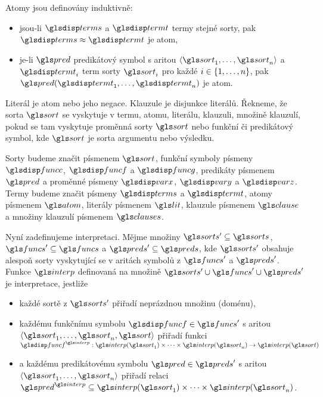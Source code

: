 Atomy jsou definovány induktivně:

\begin{itemize}
\item jsou-li $\termS$ a $\term$ termy stejné sorty,
  pak $\termS \approx \term$ je atom,
\item je-li $\pred$ predikátový symbol
  s aritou $\langle \sort_1 \comdots \sort_n \rangle$
  a $\term_i$ term sorty $\sort_i$ pro každé $i \in \{ 1 , \ldots, n \}$, pak
  $\pred(\term_1 \comdots \term_n)$ je atom.
\end{itemize}

Literál je atom nebo jeho negace. Klauzule je disjunkce literálů.
Řekneme, že sorta $\sort$ se vyskytuje v termu, atomu, literálu, klauzuli,
množině klauzulí, pokud se tam vyskytuje proměnná sorty $\sort$ nebo
funkční či predikátový symbol, kde $\sort$ je sorta argumentu nebo výsledku.


Sorty budeme značit písmenem $\sort$, funkční symboly písmeny
$\funcC$, $\func$ a $\funcG$, predikáty písmenem $\pred$
a proměnné písmeny $\var$, $\varY$ a $\varZ$.
Termy budeme značit písmeny $\termS$ a $\term$, atomy písmenem $\atom$,
literály písmenem $\lit$, klauzule písmenem $\clause$ a množiny
klauzulí písmenem $\clauses$.

Nyní zadefinujeme interpretaci.
Mějme množiny $\sorts' \subseteq \sorts$, $\funcs' \subseteq \funcs$
a $\preds' \subseteq \preds$, kde $\sorts'$ obsahuje alespoň sorty
vyskytující se v aritách symbolů z $\funcs'$ a $\preds'$.
Funkce $\interp$ definovaná na množině $\sorts' \cup \funcs' \cup \preds'$
je interpretace, jestliže

\begin{itemize}
\item každé sortě z $\sorts'$ přiřadí neprázdnou množinu (doménu),
\item každému funkčnímu symbolu $\func \in \funcs'$ s aritou
  $\langle \sort_1 \comdots \sort_n, \sort \rangle$ přiřadí funkci
  $\func^\interp: \interp(\sort_1) \timdots \interp(\sort_n) \to
  \interp(\sort)$
\item a každému predikátovému symbolu $\pred \in \preds'$ s aritou
  $\langle \sort_1 \comdots \sort_n \rangle$ přiřadí relaci
  $\pred^\interp \subseteq \interp(\sort_1) \timdots \interp(\sort_n)$.
\end{itemize}

